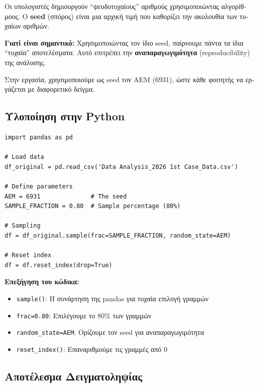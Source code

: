 \documentclass[12pt,a4paper]{article}
\begin{document}
\begin{warningbox}
\textgreek{Οι υπολογιστές δημιουργούν ``ψευδοτυχαίους'' αριθμούς χρησιμοποιώντας αλγορίθμους. Ο} \textbf{seed} \textgreek{(σπόρος) είναι μια αρχική τιμή που καθορίζει την ακολουθία των τυχαίων αριθμών.}

\textbf{\textgreek{Γιατί είναι σημαντικό:}} \textgreek{Χρησιμοποιώντας τον ίδιο seed, παίρνουμε πάντα τα ίδια ``τυχαία'' αποτελέσματα. Αυτό επιτρέπει την} \textbf{\textgreek{αναπαραγωγιμότητα}} (reproducibility) \textgreek{της ανάλυσης.}

\textgreek{Στην εργασία, χρησιμοποιούμε ως seed τον ΑΕΜ (6931), ώστε κάθε φοιτητής να εργάζεται με διαφορετικό δείγμα.}
\end{warningbox}

\subsection{\textgreek{Υλοποίηση στην Python}}

\begin{lstlisting}[caption={Sampling code}]
import pandas as pd

# Load data
df_original = pd.read_csv('Data Analysis_2026 1st Case_Data.csv')

# Define parameters
AEM = 6931              # The seed
SAMPLE_FRACTION = 0.80  # Sample percentage (80%)

# Sampling
df = df_original.sample(frac=SAMPLE_FRACTION, random_state=AEM)

# Reset index
df = df.reset_index(drop=True)
\end{lstlisting}

\textbf{\textgreek{Επεξήγηση του κώδικα:}}
\begin{itemize}
    \item \texttt{sample()}: \textgreek{Η συνάρτηση της pandas για τυχαία επιλογή γραμμών}
    \item \texttt{frac=0.80}: \textgreek{Επιλέγουμε το 80\% των γραμμών}
    \item \texttt{random\_state=AEM}: \textgreek{Ορίζουμε τον seed για αναπαραγωγιμότητα}
    \item \texttt{reset\_index()}: \textgreek{Επαναριθμούμε τις γραμμές από 0}
\end{itemize}

\subsection{\textgreek{Αποτέλεσμα Δειγματοληψίας}}
\end{document}
